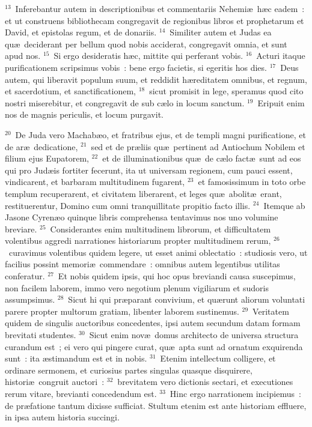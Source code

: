 ${}^{13}$~Inferebantur autem in descriptionibus et commentariis Nehemi\ae\ h\ae c eadem~: et ut construens bibliothecam congregavit de regionibus libros et prophetarum et David, et epistolas regum, et de donariis.
${}^{14}$~Similiter autem et Judas ea qu\ae\ deciderant per bellum quod nobis acciderat, congregavit omnia, et sunt apud nos.
${}^{15}$~Si ergo desideratis h\ae c, mittite qui perferant vobis.
${}^{16}$~Acturi itaque purificationem scripsimus vobis~: bene ergo facietis, si egeritis hos dies.
${}^{17}$~Deus autem, qui liberavit populum suum, et reddidit h\ae reditatem omnibus, et regnum, et sacerdotium, et sanctificationem,
${}^{18}$~sicut promisit in lege, speramus quod cito nostri miserebitur, et congregavit de sub c\ae lo in locum sanctum.
${}^{19}$~Eripuit enim nos de magnis periculis, et locum purgavit.


${}^{20}$~De Juda vero Machab\ae o, et fratribus ejus, et de templi magni purificatione, et de ar\ae\ dedicatione,
${}^{21}$~sed et de pr\ae liis qu\ae\ pertinent ad Antiochum Nobilem et filium ejus Eupatorem,
${}^{22}$~et de illuminationibus qu\ae\ de c\ae lo fact\ae\ sunt ad eos qui pro Jud\ae is fortiter fecerunt, ita ut universam regionem, cum pauci essent, vindicarent, et barbaram multitudinem fugarent,
${}^{23}$~et famosissimum in toto orbe templum recuperarent, et civitatem liberarent, et leges qu\ae\ abolit\ae\ erant, restituerentur, Domino cum omni tranquillitate propitio facto illis.
${}^{24}$~Itemque ab Jasone Cyren\ae o quinque libris comprehensa tentavimus nos uno volumine breviare.
${}^{25}$~Considerantes enim multitudinem librorum, et difficultatem volentibus aggredi narrationes historiarum propter multitudinem rerum,
${}^{26}$~curavimus volentibus quidem legere, ut esset animi oblectatio~: studiosis vero, ut facilius possint memori\ae\ commendare~: omnibus autem legentibus utilitas conferatur.
${}^{27}$~Et nobis quidem ipsis, qui hoc opus breviandi causa suscepimus, non facilem laborem, immo vero negotium plenum vigiliarum et sudoris assumpsimus.
${}^{28}$~Sicut hi qui pr\ae parant convivium, et qu\ae runt aliorum voluntati parere propter multorum gratiam, libenter laborem sustinemus.
${}^{29}$~Veritatem quidem de singulis auctoribus concedentes, ipsi autem secundum datam formam brevitati studentes.
${}^{30}$~Sicut enim nov\ae\ domus architecto de universa structura curandum est~; ei vero qui pingere curat, qu\ae\ apta sunt ad ornatum exquirenda sunt~: ita \ae stimandum est et in nobis.
${}^{31}$~Etenim intellectum colligere, et ordinare sermonem, et curiosius partes singulas quasque disquirere, histori\ae\ congruit auctori~:
${}^{32}$~brevitatem vero dictionis sectari, et executiones rerum vitare, brevianti concedendum est.
${}^{33}$~Hinc ergo narrationem incipiemus~: de pr\ae fatione tantum dixisse sufficiat. Stultum etenim est ante historiam effluere, in ipsa autem historia succingi.

